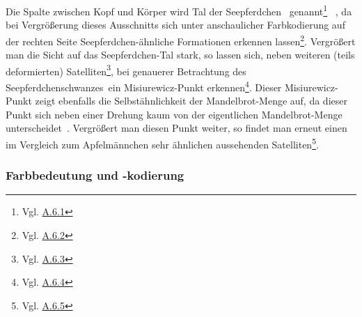 Die Spalte zwischen Kopf und K\"orper wird \glqq Tal der Seepferdchen\grqq
~genannt\footnote{Vgl. \hyperref[app:6.1]{A.6.1}}
~\cite{robert_p_seahorse_2010}, da bei Vergrößerung dieses Ausschnitts
sich unter anschaulicher Farbkodierung auf der rechten Seite
Seepferdchen-ähnliche Formationen erkennen lassen\footnote{Vgl. \hyperref[app:6.2]{A.6.2}}.
Vergrößert man die Sicht auf das Seepferdchen-Tal stark, so lassen sich,
neben weiteren (teils deformierten) Satelliten\footnote{Vgl. \hyperref[app:6.3]{A.6.3}},
bei genauerer Betrachtung des \glqq Seepferdchenschwanzes\grqq~ein
Misiurewicz-Punkt erkennen\footnote{Vgl. \hyperref[app:6.4]{A.6.4}}.
Dieser Misiurewicz-Punkt zeigt ebenfalls die Selbstähnlichkeit der Mandelbrot-Menge auf,
da dieser Punkt sich neben einer Drehung kaum von der eigentlichen
Mandelbrot-Menge unterscheidet~\cite{lei_similarity_1989}.
Vergrößert man diesen Punkt weiter, so findet man erneut einen im Vergleich
zum Apfelm\"annchen sehr ähnlichen aussehenden
Satelliten\footnote{Vgl. \hyperref[app:6.5]{A.6.5}}.

\subsubsection{Farbbedeutung und -kodierung}